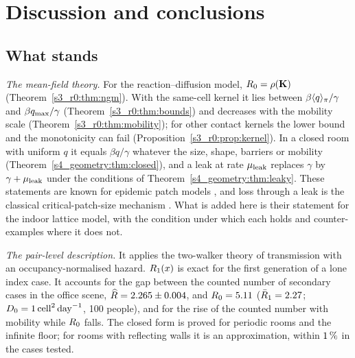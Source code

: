 \section{Discussion and conclusions}\label{s9_discussion:sec}

\subsection{What stands}\label{s9_discussion:sec:stands}

\emph{The mean-field theory.} For the reaction--diffusion model, $R_0=\rho(\mathbf{K})$
(Theorem~\ref{s3_r0:thm:ngm}). With the same-cell kernel it lies between $\beta\langle q\rangle_{\pi}/\gamma$ and
$\beta q_{\max}/\gamma$ (Theorem~\ref{s3_r0:thm:bounds}) and decreases with the mobility scale
(Theorem~\ref{s3_r0:thm:mobility}); for other contact kernels the lower bound and the monotonicity can fail
(Proposition~\ref{s3_r0:prop:kernel}). In a closed room with uniform $q$ it equals $\beta q/\gamma$ whatever
the size, shape, barriers or mobility (Theorem~\ref{s4_geometry:thm:closed}), and a leak at rate $\mu_{\mathrm{leak}}$ replaces
$\gamma$ by $\gamma+\mu_{\mathrm{leak}}$ under the conditions of Theorem~\ref{s4_geometry:thm:leaky}. These statements are known
for epidemic patch models
\citep{diekmann1990definition,vandendriessche2002reproduction,allen2007asymptotic,gao2011sis,gao2019travel,gao2020fast,chen2020asymptotic,altenberg2012resolvent},
and loss through a leak is the classical critical-patch-size mechanism
\citep{skellam1951random,cantrell2003spatial}. What is added here is their statement for the indoor lattice
model, with the condition under which each holds and counter-examples where it does not.

\emph{The pair-level description.} It applies the two-walker theory of transmission
\citep{kenkre2014theory,giuggioli2022spatio} with an occupancy-normalised hazard. $R_1(x)$ is exact for
the first generation of a lone index case. It accounts for the gap between the counted number of secondary cases
in the office scene, $\widehat{R}=2.265\pm0.004$, and $R_0=5.11$ ($\bar{R}_1=2.27$; $D_0=1\,\mathrm{cell}^2\,\mathrm{day}^{-1}$, 100 people), and for
the rise of the counted number with mobility while $R_0$ falls. The closed form is proved for periodic rooms and
the infinite floor; for rooms with reflecting walls it is an approximation, within $1\,\%$ in the cases tested.

